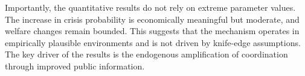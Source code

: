 Importantly, the quantitative results do not rely on extreme parameter values. The increase in crisis probability is economically meaningful but moderate, and welfare changes remain bounded. This suggests that the mechanism operates in empirically plausible environments and is not driven by knife-edge assumptions. The key driver of the results is the endogenous amplification of coordination through improved public information.